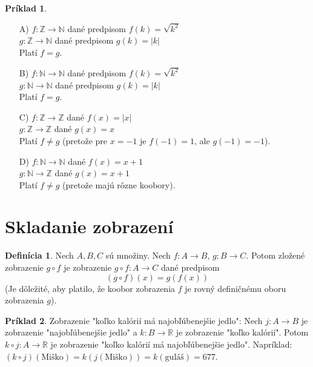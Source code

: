 \documentclass{article}
\theoremstyle{definition}
\newtheorem{definition}{Definícia}
\newtheorem{example}{Príklad}
\theoremstyle{plain}
\theoremstyle{remark}
\begin{document}
\begin{example}
\begin{enumerate}
    \item[A)] $f \colon \mathbb{Z} \rightarrow \mathbb{N}$ dané predpisom $f(k) = \sqrt{k^2}$ \\
    $g \colon \mathbb{Z} \rightarrow \mathbb{N}$ dané predpisom $g(k) = |k|$ \\
    Platí $f=g$.

    \item[B)] $f \colon \mathbb{N} \rightarrow \mathbb{N}$ dané predpisom $f(k) = \sqrt{k^2}$ \\
    $g \colon \mathbb{N} \rightarrow \mathbb{N}$ dané predpisom $g(k) = |k|$ \\
    Platí $f=g$.

    \item[C)] $f \colon \mathbb{Z} \rightarrow \mathbb{Z}$ dané $f(x) = |x|$ \\
    $g \colon \mathbb{Z} \rightarrow \mathbb{Z}$ dané $g(x) = x$ \\
    Platí $f \neq g$ (pretože pre $x=-1$ je $f(-1)=1$, ale $g(-1)=-1$).

    \item[D)] $f \colon \mathbb{N} \rightarrow \mathbb{N}$ dané $f(x) = x+1$ \\
    $g \colon \mathbb{N} \rightarrow \mathbb{Z}$ dané $g(x) = x+1$ \\
    Platí $f \neq g$ (pretože majú rôzne koobory).
\end{enumerate}
\end{example}

\section*{Skladanie zobrazení}
\begin{definition}
Nech $A, B, C$ sú množiny. Nech $f \colon A \rightarrow B$, $g \colon B \rightarrow C$. Potom zložené zobrazenie $g \circ f$ je zobrazenie $g \circ f \colon A \rightarrow C$ dané predpisom
$$ (g \circ f)(x) = g(f(x)) $$
(Je dôležité, aby platilo, že koobor zobrazenia $f$ je rovný definičnému oboru zobrazenia $g$).
\end{definition}

\begin{example}
Zobrazenie "koľko kalórií má najobľúbenejšie jedlo":
Nech $j \colon A \rightarrow B$ je zobrazenie "najobľúbenejšie jedlo" a $k \colon B \rightarrow \mathbb{R}$ je zobrazenie "koľko kalórií".
Potom $k \circ j \colon A \rightarrow \mathbb{R}$ je zobrazenie "koľko kalórií má najobľúbenejšie jedlo".
Napríklad: $(k \circ j)(\text{Miško}) = k(j(\text{Miško})) = k(\text{guláš}) = 677$.
\end{example}
\end{document}
